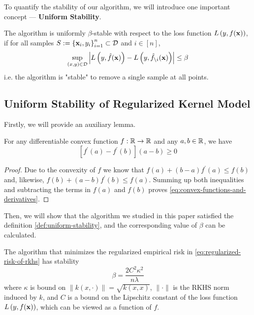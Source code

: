 To quantify the stability of our algorithm, we will introduce one important concept --- \textbf{Uniform Stability}.
\begin{definition}
	\label{def:uniform-stability}
	The algorithm is uniformly $\beta$-stable with respect to the loss function $L\left(y,f({\bf x})\right)$, if for all samples $S:=\left\{{\bf x}_{i},y_{i}\right\}_{i=1}^{n}\subset\mathcal{D}$ and $i\in[n]$,
	\begin{equation}
		\sup_{(x,y)\in\mathcal{D}}\left|L\left(y,\hat{f}({\bf x})\right)-L\left(y,\hat{f}_{\backslash i}({\bf x})\right)\right|\leq\beta
	\end{equation}
	i.e. the algorithm is "stable" to remove a single sample at all points.
\end{definition}

\subsection{Uniform Stability of Regularized Kernel Model}

Firstly, we will provide an auxiliary lemma.

\begin{lemma} \label{lem:convex-functions-and-derivatives}
	For any differentiable convex function $f:{\mathbb R}\rightarrow{\mathbb R}$ and any $a,b\in{\mathbb R}$, we have
	\begin{equation}
		\label{eq:convex-functions-and-derivatives}
		\left[f^{\prime}(a)-f^{\prime}(b)\right](a-b)\geq 0
	\end{equation}
\end{lemma}

\begin{proof}
	Due to the convexity of $f$ we know that $f(a)+(b-a) f^{\prime}(a) \leq f(b)$ and, likewise, $f(b)+(a-b) f^{\prime}(b) \leq f(a)$. Summing up both inequalities and subtracting the terms in $f(a)$ and $f(b)$ proves \eqref{eq:convex-functions-and-derivatives}.
\end{proof}

Then, we will show that the algorithm we studied in this paper satisfied the definition \ref{def:uniform-stability}, and the corresponding value of $\beta$ can be calculated.

\begin{theorem}
	\label{thm:algorithmic-stability-of-risk-minimizers}
	The algorithm that minimizes the regularized empirical risk in \eqref{eq:regularized-risk-of-rkhs} has stability
	\begin{equation}
		\beta=\frac{2C^{2}\kappa^{2}}{n\lambda}
	\end{equation}
	where $\kappa$ is bound on $\|k(x,\cdot)\|=\sqrt{k(x,x)}$, $\|\cdot\|$ is the RKHS norm induced by $k$, and $C$ is a bound on the Lipschitz constant of the loss function $L\left(y,f({\bf x})\right)$, which can be viewed as a function of $f$.
\end{theorem}

